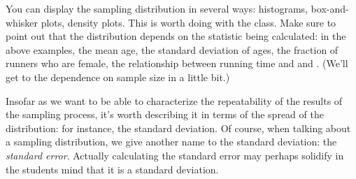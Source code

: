 You can display the sampling distribution in several ways: histograms,
box-and-whisker plots, density plots.  This is worth doing with the
class.  Make sure to point out that the distribution depends on the
statistic being calculated: in the above examples, the mean age, the standard deviation of
ages, the fraction of runners who are female, the relationship between
running time and  and .  (We'll get to the dependence
on sample size in a little bit.)

Insofar as we want to be able to characterize the repeatability of the
results of the sampling process, it's worth describing it in terms of the spread of
the distribution: for instance, the standard deviation.  Of course, when talking
about a sampling distribution, we give another name to the standard
deviation: the {\em standard error}.   Actually calculating the
standard error may perhaps solidify in the students mind that it is a
standard deviation.

\begin{knitrout}
\end{knitrout}




